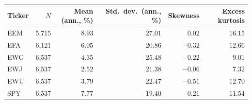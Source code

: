 \begin{tabular}{lrrrrr}
\toprule
Ticker & $N$ & Mean (ann., \%) & Std.\ dev.\ (ann., \%) & Skewness & Excess kurtosis \\
\midrule
EEM & 5,715 & $8.93$ & $27.01$ & $0.02$ & $16.15$ \\
EFA & 6,121 & $6.05$ & $20.86$ & $-0.32$ & $12.66$ \\
EWG & 6,537 & $4.35$ & $25.48$ & $-0.22$ & $9.01$ \\
EWJ & 6,537 & $2.52$ & $21.38$ & $-0.06$ & $7.32$ \\
EWU & 6,537 & $3.79$ & $22.47$ & $-0.51$ & $12.70$ \\
SPY & 6,537 & $7.77$ & $19.40$ & $-0.21$ & $11.54$ \\
\bottomrule
\end{tabular}
